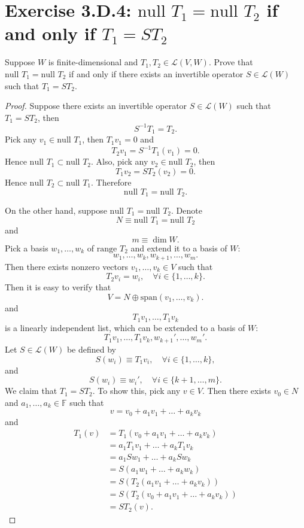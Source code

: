 \section{Exercise 3.D.4: $\text{null }T_1=\text{null }T_2$ if and only if $T_1=ST_2$}
\label{Exercise 3.D.4}
Suppose $W$ is finite-dimensional and $T_1,T_2\in\mathcal{L}(V,W)$. Prove that $\text{null }T_1=\text{null }T_2$ if and only if there exists an invertible operator $S\in\mathcal{L}(W)$ such that $T_1=ST_2$.
\begin{proof}
Suppose there exists an invertible operator $S\in\mathcal{L}(W)$ such that $T_1=ST_2$, then\[
S^{-1}T_1=T_2.
\]Pick any $v_1\in\text{null }T_1$, then $T_1v_1=0$ and \[
T_2v_1=S^{-1}T_1(v_1)=0.
\]Hence $\text{null }T_1\subset\text{null }T_2$. Also, pick any $v_2\in\text{null }T_2$, then\[
T_1v_2=ST_2(v_2)=0.
\]Hence $\text{null }T_2\subset\text{null }T_1$. Therefore\[
\text{null }T_1=\text{null }T_2.
\]

On the other hand, suppose $\text{null }T_1=\text{null }T_2$. Denote\[
N\equiv\text{null }T_1=\text{null }T_2
\]and\[
m\equiv\dim W.
\]Pick a basis $w_1,\dots,w_k$ of $\text{range }T_2$ and extend it to a basis of $W$:\[
w_1,\dots,w_k,w_{k+1},\dots,w_m.
\]Then there exists nonzero vectors $v_1,\dots,v_k\in V$ such that\[
T_2v_i=w_i,\quad\forall i\in\{1,\dots,k\}.
\]Then it is easy to verify that\[
V=N\oplus\text{span}(v_1,\dots,v_k).
\]and\[
T_1v_1,\dots,T_1v_k
\]is a linearly independent list, which can be extended to a basis of $W$:\[
T_1v_1,\dots,T_1v_k,w_{k+1}',\dots,w_m'.
\]Let $S\in\mathcal{L}(W)$ be defined by\[
S(w_i)\equiv T_1v_i,\quad\forall i\in\{1,\dots,k\},
\]and\[
S(w_i)\equiv w_i',\quad\forall i\in\{k+1,\dots,m\}.
\]We claim that $T_1=ST_2$. To show this, pick any $v\in V$. Then there exists $v_0\in N$ and $a_1,\dots,a_k\in\mathbb{F}$ such that\[
v=v_0+a_1v_1+\dots+a_kv_k
\]and\[
\begin{split}
T_1(v)&=T_1(v_0+a_1v_1+\dots+a_kv_k)\\
&=a_1T_1v_1+\dots+a_kT_1v_k\\
&=a_1Sw_1+\dots+a_kSw_k\\
&=S(a_1w_1+\dots+a_kw_k)\\
&=S(T_2(a_1v_1+\dots+a_kv_k))\\
&=S(T_2(v_0+a_1v_1+\dots+a_kv_k))\\
&=ST_2(v).
\end{split}
\]
\end{proof}
